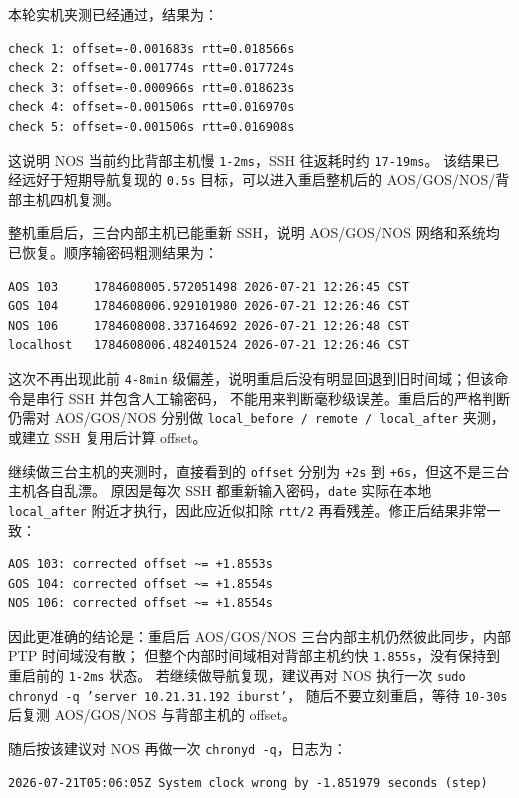 \documentclass[UTF8,11pt,a4paper]{ctexart}
\begin{document}
本轮实机夹测已经通过，结果为：

\begin{verbatim}
check 1: offset=-0.001683s rtt=0.018566s
check 2: offset=-0.001774s rtt=0.017724s
check 3: offset=-0.000966s rtt=0.018623s
check 4: offset=-0.001506s rtt=0.016970s
check 5: offset=-0.001506s rtt=0.016908s
\end{verbatim}

这说明 NOS 当前约比背部主机慢 \texttt{1-2ms}，SSH 往返耗时约 \texttt{17-19ms}。
该结果已经远好于短期导航复现的 \texttt{0.5s} 目标，可以进入重启整机后的 AOS/GOS/NOS/背部主机四机复测。

整机重启后，三台内部主机已能重新 SSH，说明 AOS/GOS/NOS 网络和系统均已恢复。顺序输密码粗测结果为：

\begin{verbatim}
AOS 103     1784608005.572051498 2026-07-21 12:26:45 CST
GOS 104     1784608006.929101980 2026-07-21 12:26:46 CST
NOS 106     1784608008.337164692 2026-07-21 12:26:48 CST
localhost   1784608006.482401524 2026-07-21 12:26:46 CST
\end{verbatim}

这次不再出现此前 \texttt{4-8min} 级偏差，说明重启后没有明显回退到旧时间域；但该命令是串行 SSH 并包含人工输密码，
不能用来判断毫秒级误差。重启后的严格判断仍需对 AOS/GOS/NOS 分别做 \texttt{local\_before / remote / local\_after}
夹测，或建立 SSH 复用后计算 offset。

继续做三台主机的夹测时，直接看到的 \texttt{offset} 分别为 \texttt{+2s} 到 \texttt{+6s}，但这不是三台主机各自乱漂。
原因是每次 SSH 都重新输入密码，\texttt{date} 实际在本地 \texttt{local\_after} 附近才执行，因此应近似扣除
\texttt{rtt/2} 再看残差。修正后结果非常一致：

\begin{verbatim}
AOS 103: corrected offset ~= +1.8553s
GOS 104: corrected offset ~= +1.8554s
NOS 106: corrected offset ~= +1.8554s
\end{verbatim}

因此更准确的结论是：重启后 AOS/GOS/NOS 三台内部主机仍然彼此同步，内部 PTP 时间域没有散；
但整个内部时间域相对背部主机约快 \texttt{1.855s}，没有保持到重启前的 \texttt{1-2ms} 状态。
若继续做导航复现，建议再对 NOS 执行一次 \texttt{sudo chronyd -q 'server 10.21.31.192 iburst'}，
随后不要立刻重启，等待 \texttt{10-30s} 后复测 AOS/GOS/NOS 与背部主机的 offset。

随后按该建议对 NOS 再做一次 \texttt{chronyd -q}，日志为：

\begin{verbatim}
2026-07-21T05:06:05Z System clock wrong by -1.851979 seconds (step)
\end{verbatim}
\end{document}
